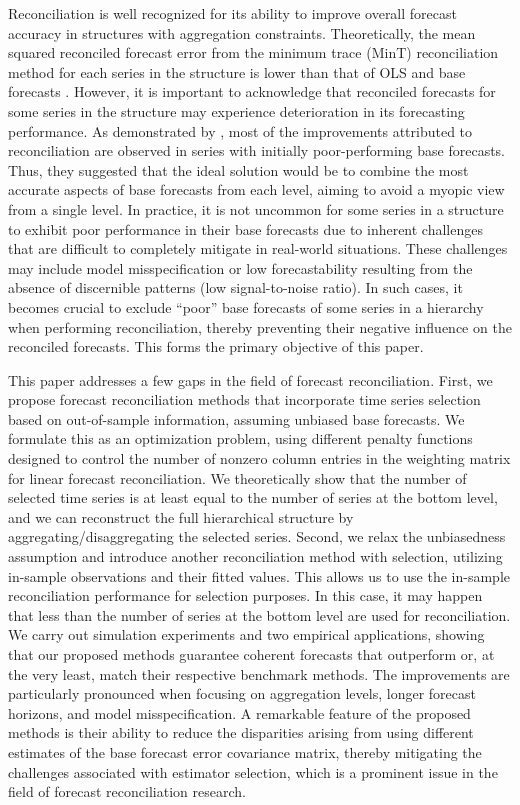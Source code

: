 \documentclass[11pt,a4paper,]{article}
\begin{document}
Reconciliation is well recognized for its ability to improve overall
forecast accuracy in structures with aggregation constraints.
Theoretically, the mean squared reconciled forecast error from the
minimum trace (MinT) reconciliation method for each series in the
structure is lower than that of OLS and base forecasts
\autocite{Wickramasuriya2021-am}. However, it is important to
acknowledge that reconciled forecasts for some series in the structure
may experience deterioration in its forecasting performance. As
demonstrated by \textcite{Athanasopoulos2017-jj}, most of the
improvements attributed to reconciliation are observed in series with
initially poor-performing base forecasts. Thus, they suggested that the
ideal solution would be to combine the most accurate aspects of base
forecasts from each level, aiming to avoid a myopic view from a single
level. In practice, it is not uncommon for some series in a structure to
exhibit poor performance in their base forecasts due to inherent
challenges that are difficult to completely mitigate in real-world
situations. These challenges may include model misspecification or low
forecastability resulting from the absence of discernible patterns (low
signal-to-noise ratio). In such cases, it becomes crucial to exclude
``poor'' base forecasts of some series in a hierarchy when performing
reconciliation, thereby preventing their negative influence on the
reconciled forecasts. This forms the primary objective of this paper.

This paper addresses a few gaps in the field of forecast reconciliation.
First, we propose forecast reconciliation methods that incorporate time
series selection based on out-of-sample information, assuming unbiased
base forecasts. We formulate this as an optimization problem, using
different penalty functions designed to control the number of nonzero
column entries in the weighting matrix for linear forecast
reconciliation. We theoretically show that the number of selected time
series is at least equal to the number of series at the bottom level,
and we can reconstruct the full hierarchical structure by
aggregating/disaggregating the selected series. Second, we relax the
unbiasedness assumption and introduce another reconciliation method with
selection, utilizing in-sample observations and their fitted values.
This allows us to use the in-sample reconciliation performance for
selection purposes. In this case, it may happen that less than the
number of series at the bottom level are used for reconciliation. We
carry out simulation experiments and two empirical applications, showing
that our proposed methods guarantee coherent forecasts that outperform
or, at the very least, match their respective benchmark methods. The
improvements are particularly pronounced when focusing on aggregation
levels, longer forecast horizons, and model misspecification. A
remarkable feature of the proposed methods is their ability to reduce
the disparities arising from using different estimates of the base
forecast error covariance matrix, thereby mitigating the challenges
associated with estimator selection, which is a prominent issue in the
field of forecast reconciliation research.
\end{document}
